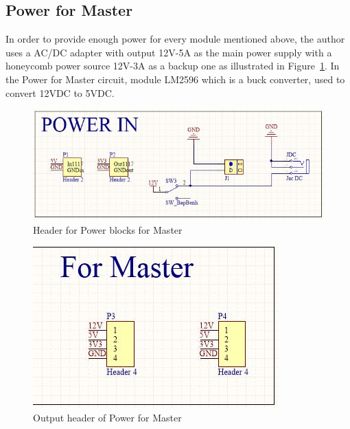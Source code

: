           \subsection{Power for Master}\label{powerForMasterDesign}
          In order to provide enough power for every module mentioned above, the author uses a AC/DC adapter with output 12V-5A as the main power supply with a honeycomb power source 12V-3A as a backup one as illustrated in Figure~\ref{fig:powerMaster}. In the Power for Master circuit, module LM2596 which is a buck converter, used to convert 12VDC to 5VDC. 
          \begin{figure}[!ht]
            \begin{center}
            \includegraphics[scale=0.8]{images/powerMaster.JPG}
            \caption{Header for Power blocks for Master}
            \label{fig:powerMaster}
            \end{center}
          \end{figure}
          \begin{figure}[!ht]
            \begin{center}
            \includegraphics[scale=1]{images/headerPowerOut.JPG}
            \caption{Output header of Power for Master}
            \label{fig:headerPowerOut}
            \end{center}
          \end{figure}
